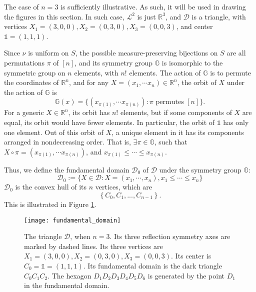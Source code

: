 The case of \(n = 3\) is sufficiently illustrative. As such, it will be used in drawing the figures in this section. In such case, \(\mathscr{L}^2\) is just \(\mathbb{R}^3\), and \(\mathscr{D}\) is a triangle, with vertices \(X_1 = (3, 0, 0), X_2 = (0, 3, 0), X_3 = (0, 0, 3)\), and center \(\mathds{1} = (1, 1, 1)\).

Since \(\nu\) is uniform on \(S\), the possible measure-preserving bijections on \(S\) are all permutations \(\pi\) of \([n]\), and its symmetry group \(\mathbb{G}\) is isomorphic to the symmetric group on \(n\) elements, with \(n!\) elements. The action of \(\mathbb{G}\) is to permute the coordinates of \(\mathbb{R}^n\), and for any \(X = (x_1, \cdots x_n) \in \mathbb{R}^n\), the orbit of \(X\) under the action of \(\mathbb{G}\) is 
\[ \mathbb{G}(x) =  \{(x_{\pi(1)}, \cdots x_{\pi(n)}) : \pi \text{ permutes } [n]\} .
\]
For a generic \(X \in \mathbb{R}^n\), its orbit has \(n!\) elements, but if some components of \(X\) are equal, its orbit would have fewer elements. In particular, the orbit of \(\mathds{1}\) has only one element. Out of this orbit of \(X\), a unique element in it has its components arranged in nondecreasing order. That is, \(\exists \pi \in \mathbb{G}\), such that \(X \circ \pi = (x_{\pi(1)}, \cdots x_{\pi(n)})\), and \(x_{\pi(1)}\le \cdots \le x_{\pi(n)}\). 

Thus, we define the fundamental domain \(\mathscr{D}_0\) of \(\mathscr{D}\) under the symmetry group \(\mathbb{G}\):
\begin{equation}
\mathscr{D}_0 := \{X \in \mathscr{D} : X = (x_1, \cdots , x_n), x_1 \le \cdots \le x_n\} 
\label{eq:fundamental_domain}
\end{equation}
$\mathscr{D}_0$ is the convex hull of its $n$ vertices, which are 
\begin{equation}
\left\{C_0, C_1, ..., C_{n-1}\right\}.
\end{equation}
This is illustrated in Figure \ref{fig:fundamental_domain}.

\begin{figure}[h]
	\centering
	\texttt{[image: fundamental\_domain]}
	\caption{The triangle \(\mathscr{D}\), when \(n=3\). Its three reflection symmetry axes are marked by dashed lines. Its three vertices are \(X_1 = (3,0,0), X_2 = (0,3,0), X_3=(0,0,3)\). Its center is \(C_0 = \mathds{1} = (1,1,1)\). Its fundamental domain is the dark triangle \(C_0C_1C_2\). The hexagon \(D_1D_2D_3D_4D_5D_6\) is generated by the point \(D_1\) in the fundamental domain.}
	\label{fig:fundamental_domain}
\end{figure}

